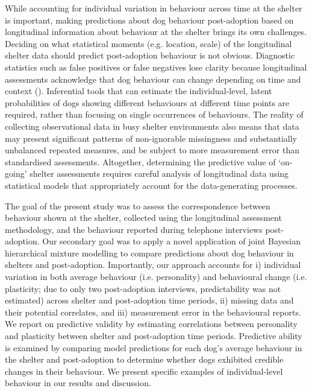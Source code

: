 \documentclass[12pt]{article}
\begin{document}
While accounting for individual variation in behaviour across time at the shelter is important, making predictions about dog behaviour post-adoption based on longitudinal information about behaviour at the shelter brings its own challenges. Deciding on what statistical moments (e.g. location, scale) of the longitudinal shelter data should predict post-adoption behaviour is not obvious. Diagnostic statistics such as false positives or false negatives lose clarity because longitudinal assessments acknowledge that dog behaviour can change depending on time and context (\cite{goold2017modelling}). Inferential tools that can estimate the individual-level, latent probabilities of dogs showing different behaviours at different time points are required, rather than focusing on single occurrences of behaviours. The reality of collecting observational data in busy shelter environments also means that data may present significant patterns of non-ignorable missingness and substantially unbalanced repeated measures, and be subject to more measurement error than standardised assessments. Altogether, determining the predictive value of `on-going' shelter assessments requires careful analysis of longitudinal data using statistical models that appropriately account for the data-generating processes.

The goal of the present study was to assess the correspondence between behaviour shown at the shelter, collected using the longitudinal assessment methodology, and the behaviour reported during telephone interviews post-adoption. Our secondary goal was to apply a novel application of joint Bayesian hierarchical mixture modelling to compare predictions about dog behaviour in shelters and post-adoption. Importantly, our approach accounts for i) individual variation in both average behaviour (i.e. personality) and behavioural change (i.e. plasticity; due to only two post-adoption interviews, predictability was not estimated) across shelter and post-adoption time periods, ii) missing data and their potential correlates, and iii) measurement error in the behavioural reports. We report on predictive validity by estimating correlations between personality and plasticity between shelter and post-adoption time periods. Predictive ability is examined by comparing model predictions for each dog's average behaviour in the shelter and post-adoption to determine whether dogs exhibited credible changes in their behaviour. We present specific examples of individual-level behaviour in our results and discussion.
\end{document}
